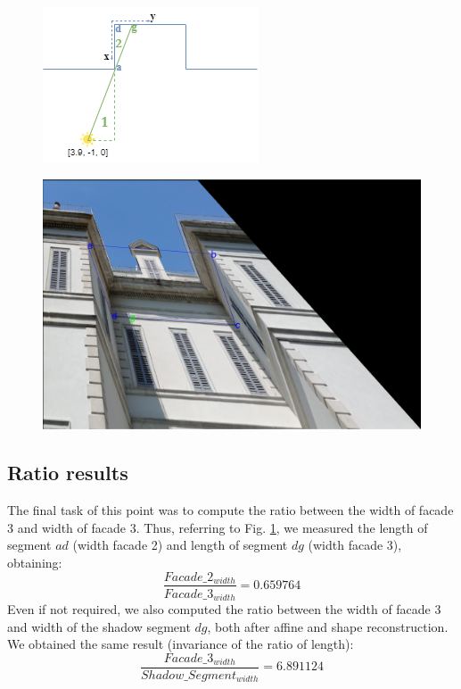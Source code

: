 \documentclass[11pt, oneside]{article}
\begin{document}
\begin{figure}[!h]
	\centering
	\begin{minipage}{.45\textwidth}
		\centering
		\includegraphics[scale = 0.75]{scene_triangles.png}
		\label{scene_triangles}
	\end{minipage}%
	\quad
	\begin{minipage}{.5\textwidth}
		\centering
		\includegraphics[scale = 0.275]{image_affine_reconstruction.png}
		\label{image_shape_reconstruction}
	\end{minipage}
\end{figure}

\subsection{Ratio results}
The final task of this point was to compute the ratio between the width of facade 3 and width of facade 3. Thus, referring to Fig. \ref{image_shape_reconstruction}, we measured the length of segment $ad$ (width facade 2) and length of segment $dg$ (width facade 3), obtaining:
$$\frac{Facade\_2_{width}}{Facade\_3_{width}} = 0.659764$$
Even if not required, we also computed the ratio between the width of facade 3 and width of the shadow segment $dg$, both after affine and shape reconstruction. We obtained the same result (invariance of the ratio of length):
$$\frac{Facade\_3_{width}}{Shadow\_Segment_{width}} = 6.891124$$
\end{document}
